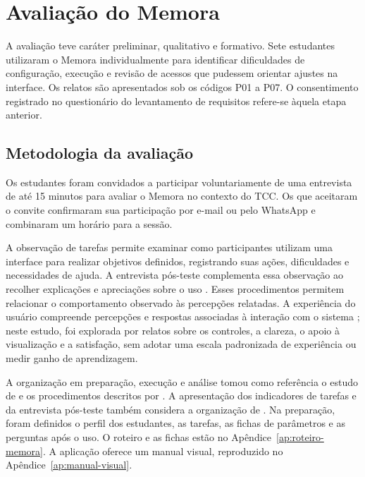 \section{Avaliação do Memora}
\label{sec:avaliacao}

A avaliação teve caráter preliminar, qualitativo e formativo. Sete estudantes utilizaram o Memora individualmente para identificar dificuldades de configuração, execução e revisão de acessos que pudessem orientar ajustes na interface. Os relatos são apresentados sob os códigos P01 a P07. O consentimento registrado no questionário do levantamento de requisitos refere-se àquela etapa anterior.

\subsection{Metodologia da avaliação}
\label{sec:plano-avaliacao}

Os estudantes foram convidados a participar voluntariamente de uma entrevista de até 15 minutos para avaliar o Memora no contexto do TCC. Os que aceitaram o convite confirmaram sua participação por e-mail ou pelo WhatsApp e combinaram um horário para a sessão.

A observação de tarefas permite examinar como participantes utilizam uma interface para realizar objetivos definidos, registrando suas ações, dificuldades e necessidades de ajuda. A entrevista pós-teste complementa essa observação ao recolher explicações e apreciações sobre o uso \cite{barbosa2010ihc}. Esses procedimentos permitem relacionar o comportamento observado às percepções relatadas. A experiência do usuário compreende percepções e respostas associadas à interação com o sistema \cite{hassenzahl2013ux,norman1998definition}; neste estudo, foi explorada por relatos sobre os controles, a clareza, o apoio à visualização e a satisfação, sem adotar uma escala padronizada de experiência ou medir ganho de aprendizagem.

A organização em preparação, execução e análise tomou como referência o estudo de  e os procedimentos descritos por . A apresentação dos indicadores de tarefas e da entrevista pós-teste também considera a organização de . Na preparação, foram definidos o perfil dos estudantes, as tarefas, as fichas de parâmetros e as perguntas após o uso. O roteiro e as fichas estão no Apêndice~\ref{ap:roteiro-memora}. A aplicação oferece um manual visual, reproduzido no Apêndice~\ref{ap:manual-visual}.

